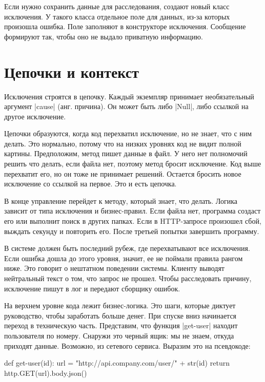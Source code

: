 Если нужно сохранить данные для расследования, создают новый класс исключения. У
такого класса отдельное поле для данных, из-за которых произошла ошибка. Поле
заполняют в конструкторе исключения. Сообщение формируют так, чтобы оно не
выдало приватную информацию.

\section{Цепочки и контекст}

Исключения строятся в цепочку. Каждый экземпляр принимает необязательный
аргумент \spverb|cause| (анг. причина). Он может быть либо \spverb|Null|, либо
ссылкой на другое исключение.

Цепочки образуются, когда код перехватил исключение, но не знает, что с ним
делать. Это нормально, потому что на низких уровнях код не видит полной
картины. Предположим, метод пишет данные в файл. У него нет полномочий решить
что делать, если файла нет, поэтому метод бросит исключение. Код выше перехватит
его, но он тоже не принимает решений. Остается бросить новое исключение со
ссылкой на первое. Это и есть цепочка.

В конце управление перейдет к методу, который знает, что делать. Логика зависит
от типа исключения и бизнес-правил. Если файла нет, программа создаст его или
выполнит поиск в других папках. Если в HTTP-запросе произошел сбой, выждать
секунду и повторить его. После третьей попытки завершить программу.

В системе должен быть последний рубеж, где перехватывают все исключения. Если
ошибка дошла до этого уровня, значит, ее не поймали правила рангом ниже. Это
говорит о нештатном поведении системы. Клиенту выводят нейтральный текст о том,
что запрос не прошел. Чтобы расследовать причину, исключение пишут в лог и
передают сборщику ошибок.

На верхнем уровне кода лежит бизнес-логика. Это шаги, которые диктует
руководство, чтобы заработать больше денег. При спуске вниз начинается переход в
техническую часть. Представим, что функция \spverb|get-user| находит
пользователя по номеру. Снаружи это черный ящик: мы не знаем, откуда приходят
данные. Возможно, из сетевого сервиса. Выразим это на псевдокоде:

\begin{english}
  \begin{python}
def get-user(id):
  url = "http://api.company.com/user/" + str(id)
  return http.GET(url).body.json()
  \end{python}
\end{english}


